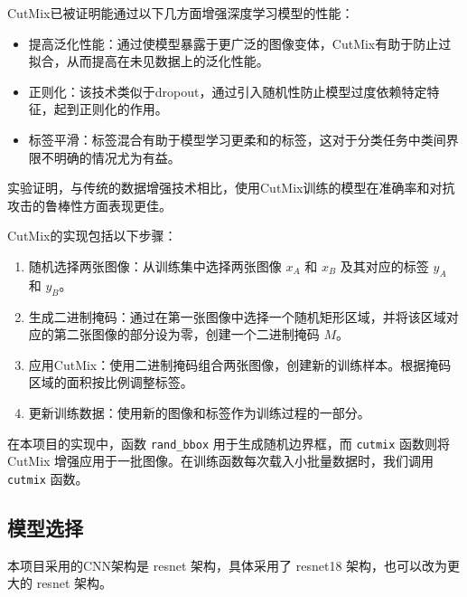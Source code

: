 \documentclass[notitlepage,cs4size,punct,oneside]{ctexrep}
\numberwithin{equation}{chapter}
\theoremstyle{mystyle}
\begin{document}
CutMix已被证明能通过以下几方面增强深度学习模型的性能：
\begin{itemize}
    \item 提高泛化性能：通过使模型暴露于更广泛的图像变体，CutMix有助于防止过拟合，从而提高在未见数据上的泛化性能。
    \item 正则化：该技术类似于dropout，通过引入随机性防止模型过度依赖特定特征，起到正则化的作用。
    \item 标签平滑：标签混合有助于模型学习更柔和的标签，这对于分类任务中类间界限不明确的情况尤为有益。
\end{itemize}
实验证明，与传统的数据增强技术相比，使用CutMix训练的模型在准确率和对抗攻击的鲁棒性方面表现更佳。

CutMix的实现包括以下步骤：
\begin{enumerate}
    \item 随机选择两张图像：从训练集中选择两张图像 $x_A$ 和 $x_B$ 及其对应的标签 $y_A$ 和 $y_B$。
    \item 生成二进制掩码：通过在第一张图像中选择一个随机矩形区域，并将该区域对应的第二张图像的部分设为零，创建一个二进制掩码 $M$。
    \item 应用CutMix：使用二进制掩码组合两张图像，创建新的训练样本。根据掩码区域的面积按比例调整标签。
    \item 更新训练数据：使用新的图像和标签作为训练过程的一部分。
\end{enumerate}

在本项目的实现中，函数 \texttt{rand\_bbox} 用于生成随机边界框，而 \texttt{cutmix} 函数则将 CutMix 增强应用于一批图像。在训练函数每次载入小批量数据时，我们调用\texttt{cutmix} 函数。


\subsection{模型选择}
本项目采用的CNN架构是 resnet 架构，具体采用了 resnet18 架构，也可以改为更大的 resnet 架构。
\end{document}
